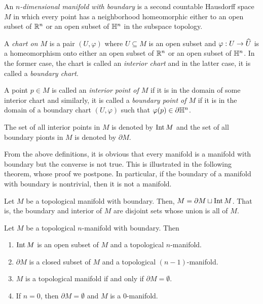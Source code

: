 \begin{definition}
    An \emph{$n$-dimensional manifold with boundary} is a second countable Hausdorff space $M$ in which every point has a neighborhood homeomorphic either to an open subset of $\mathbb{R}^n$ or an open subset of $\mathbb H^n$ in the subspace topology.

    A \emph{chart on $M$} is a pair $(U,\varphi)$ where $U\subseteq M$ is an open subset and $\varphi:U\to\widehat{U}$ is a homeomorphism onto either an open subset of $\mathbb{R}^n$ or an open subset of $\mathbb H^n$. In the former case, the chart is called an \emph{interior chart} and in the latter case, it is called a \emph{boundary chart}.

    A point $p\in M$ is called an \emph{interior point of $M$} if it is in the domain of some interior chart and similarly, it is called a \emph{boundary point of $M$} if it is in the domain of a boundary chart $(U,\varphi)$ such that $\varphi(p)\in\partial\mathbb H^n$.

    The set of all interior points in $M$ is denoted by $\operatorname{Int} M$ and the set of all boundary pionts in $M$ is denoted by $\partial M$.
\end{definition}

\begin{remark}
    From the above definitions, it is obvious that every manifold is a manifold with boundary but the converse is not true. This is illustrated in the following theorem, whose proof we postpone.  In particular, if the boundary of a manifold with boundary is nontrivial, then it is not a manifold.
\end{remark}

\begin{theorem}
    Let $M$ be a topological manifold with boundary. Then, $M = \partial M\sqcup\operatorname{Int} M$. That is, the boundary and interior of $M$ are disjoint sets whose union is all of $M$.
\end{theorem}

\begin{proposition}
    Let $M$ be a topological $n$-manifold with boundary. Then 
    \begin{enumerate}[label=(\alph*)]
        \item $\operatorname{Int} M$ is an open subset of $M$ and a topological $n$-manifold. 
        \item $\partial M$ is a closed subset of $M$ and a topological $(n - 1)$-manifold. 
        \item $M$ is a topological manifold if and only if $\partial M = \emptyset$. 
        \item If $n = 0$, then $\partial M = \emptyset$ and $M$ is a $0$-manifold.
    \end{enumerate}
\end{proposition}

